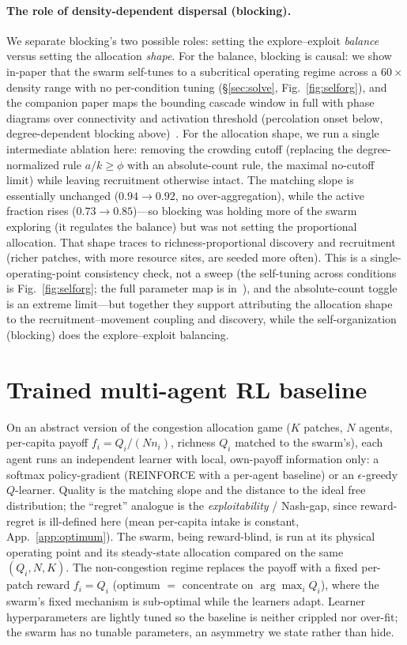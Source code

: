 \documentclass{article}
\begin{document}
\paragraph{The role of density-dependent dispersal (blocking).} We separate blocking's two possible roles:
setting the explore--exploit \emph{balance} versus setting the allocation \emph{shape}. For the balance,
blocking is causal: we show in-paper that the swarm self-tunes to a subcritical operating regime across a
$60\times$ density range with no per-condition tuning (\S\ref{sec:solve}, Fig.~\ref{fig:selforg}), and the
companion paper maps the bounding cascade window in full with phase diagrams over connectivity and activation
threshold (percolation onset below, degree-dependent blocking above)~\citep{partI}. For the allocation shape,
we run a single
intermediate ablation here: removing the crowding cutoff (replacing the degree-normalized rule $a/k\ge\phi$ with
an absolute-count rule, the maximal no-cutoff limit) while leaving recruitment otherwise intact. The matching
slope is essentially unchanged ($0.94\to0.92$, no over-aggregation), while the active fraction rises
($0.73\to0.85$)---so blocking was holding more of the swarm exploring (it regulates the balance) but was not
setting the proportional allocation. That shape traces to richness-proportional discovery and recruitment
(richer patches, with more resource sites, are seeded more often). This is a single-operating-point consistency
check, not a sweep (the self-tuning across conditions is Fig.~\ref{fig:selforg}; the full parameter map is
in~\citep{partI}), and the absolute-count toggle is an extreme limit---but together they support attributing
the allocation shape to the
recruitment--movement coupling and discovery, while the self-organization (blocking) does the
explore--exploit balancing.

\section{Trained multi-agent RL baseline}
\label{app:marl}
On an abstract version of the congestion allocation game ($K$ patches, $N$ agents, per-capita payoff
$f_i=Q_i/(N n_i)$, richness $Q_i$ matched to the swarm's), each agent runs an independent learner with local,
own-payoff information only: a softmax policy-gradient (REINFORCE with a per-agent baseline) or an
$\epsilon$-greedy $Q$-learner. Quality is the matching slope and the distance to the ideal free distribution;
the ``regret'' analogue is the \emph{exploitability} / Nash-gap, since reward-regret is ill-defined here (mean
per-capita intake is constant, App.~\ref{app:optimum}). The swarm, being reward-blind, is run at its physical
operating point and its steady-state allocation compared on the same $(Q_i,N,K)$. The non-congestion regime
replaces the payoff with a fixed per-patch reward $f_i=Q_i$ (optimum $=$ concentrate on $\arg\max_i Q_i$),
where the swarm's fixed mechanism is sub-optimal while the learners adapt. Learner hyperparameters are lightly
tuned so the baseline is neither crippled nor over-fit; the swarm has no tunable parameters, an asymmetry we
state rather than hide.
\end{document}

